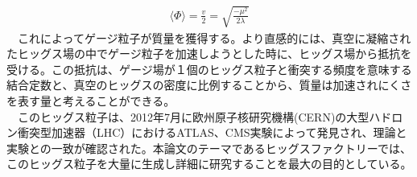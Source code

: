\begin{align}
\label{higgsvalue}
\langle \Phi \rangle = \frac{v}{2} = \sqrt{\frac{-{\mu}^2}{2\lambda}}
\end{align}
　これによってゲージ粒子が質量を獲得する。より直感的には、真空に凝縮されたヒッグス場の中でゲージ粒子を加速しようとした時に、ヒッグス場から抵抗を受ける。この抵抗は、ゲージ場が１個のヒッグス粒子と衝突する頻度を意味する結合定数と、真空のヒッグスの密度に比例することから、質量は加速されにくさを表す量と考えることができる。\\
　このヒッグス粒子は、2012年7月に欧州原子核研究機構(CERN)の大型ハドロン衝突型加速器（LHC）におけるATLAS、CMS実験によって発見され、理論と実験との一致が確認された。本論文のテーマであるヒッグスファクトリーでは、このヒッグス粒子を大量に生成し詳細に研究することを最大の目的としている。\\
